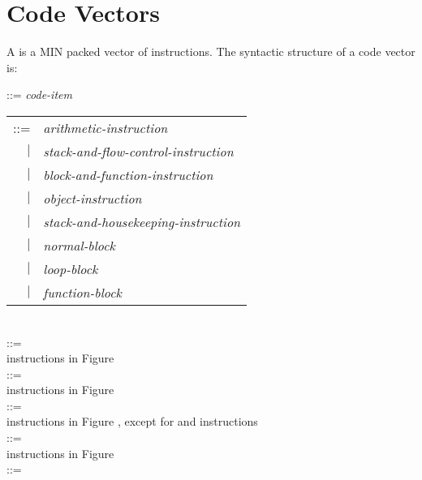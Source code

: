 \documentclass[12pt]{article}
\begin{document}
\section{Code Vectors}
\label{CODE-VECTORS}

A  is a MIN packed vector of instructions.
The syntactic structure of a code vector is:

\begin{indpar}
 ::= {\em code-item}\STAR{}
\\[0.5ex]
 \begin{tabular}[t]{@{}rl} 
		  ::= & {\em arithmetic-instruction} \\
		  $|$ & {\em stack-and-flow-control-instruction} \\
		  $|$ & {\em block-and-function-instruction} \\
		  $|$ & {\em object-instruction} \\
		  $|$ & {\em stack-and-housekeeping-instruction} \\
		  $|$ & {\em normal-block} \\
		  $|$ & {\em loop-block} \\
		  $|$ & {\em function-block} \\
		  \end{tabular}
\\[0.5ex]
 ::= \\
\hspace*{3em}
    instructions in Figure 
\\[0.5ex]
 ::= \\
\hspace*{3em}
     instructions in Figure 
\\[0.5ex]
 ::= \\
\hspace*{3em}
     instructions in Figure ,
     except for  and  instructions
\\[0.5ex]
 ::= \\
\hspace*{3em}
     instructions in Figure 
\\[0.5ex]
 ::= \\
\hspace*{3em}

\end{indpar}
\end{document}
